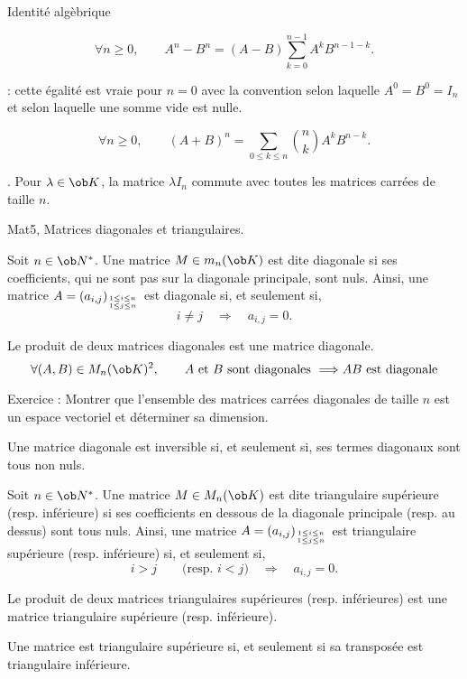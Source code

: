 \Concept [] Identit\'e alg\`ebrique


\Theoreme [$A$ et $B$ matrices carr\'ees de m\^eme taille v\'erifiant {$AB=BA$}]
$$
\forall n\ge0,\qquad A^n-B^n=(A-B)\sum_{k=0}^{n-1}A^kB^{n-1-k}.
$$

\Remarque : 
cette \'egalit\'e est vraie pour $n=0$ avec la convention selon laquelle $A^0=B^0=I_n$ et selon laquelle une somme vide est nulle. 
\bigskip

\Theoreme [Title=Bin\^ome de Newton;$A$ et $B$ matrices carr\'ees de m\^eme taille v\'erifiant {$AB=BA$}] 
$$
\forall n\ge0,\qquad (A+B)^n=\sum_{0\le k\le n}{n\choose k}A^kB^{n-k}.
$$

\Remarque. Pour $\lambda\in\ob K$, la matrice $\lambda I_n$ commute avec toutes les matrices carr\'ees de taille $n$. 
\bigskip

\Subsection Mat5, Matrices diagonales et triangulaires. 

\Definition []  Soit $n\in\ob N^*$. Une matrice $M\in\sc m_n(\ob K)$ est dite diagonale si ses coefficients, qui ne sont pas sur la diagonale principale, sont nuls. Ainsi, une matrice $A=(a_{i,j})_{1\le i\le n\atop1\le j\le n}$ est diagonale si, et seulement si, 
$$
i\neq j\quad \Longrightarrow\quad a_{i,j}=0.
$$

\Propriete []  Le produit de deux matrices diagonales est une matrice diagonale. 
$$
\forall (A,B)\in\sc M_n(\ob K)^2, \qquad A\mbox{ et }B \mbox{ sont diagonales }\Longrightarrow AB\mbox{ est diagonale}
$$

Exercice :  Montrer que l'ensemble des matrices carr\'ees diagonales de taille $n$ est un espace vectoriel et d\'eterminer sa dimension. 
\bigskip

\Propriete []  Une matrice diagonale est inversible si, et seulement si, ses termes diagonaux sont tous non nuls. 
\bigskip

\Definition []  Soit $n\in\ob N^*$. Une matrice $M\in\sc M_n(\ob K)$ est dite triangulaire sup\'erieure (resp. inf\'erieure) si ses coefficients en dessous de la diagonale principale (resp. au dessus) sont tous nuls. Ainsi, une matrice $A=(a_{i,j})_{1\le i\le n\atop1\le j\le n}$ est triangulaire sup\'erieure (resp. inf\'erieure) si, et seulement si, 
$$
i> j\qquad \mbox{(resp. $i<j$)}\quad \Longrightarrow\quad a_{i,j}=0.
$$

\Propriete []  Le produit de deux matrices triangulaires sup\'erieures (resp. inf\'erieures) est une matrice 
triangulaire sup\'erieure (resp. inf\'erieure). 
\bigskip

\Propriete []  Une matrice est triangulaire sup\'erieure si, et seulement si sa transpos\'ee est triangulaire inf\'erieure.
\bigskip 

